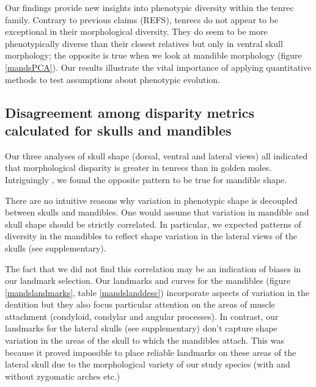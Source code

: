 \documentclass[12pt,a4paper]{article}
\begin{document}
Our findings provide new insights into phenotypic diversity within the tenrec family. Contrary to previous claims (REFS), tenrecs do not appear to be exceptional in their morphological diversity. They do seem to be more phenotypically diverse than their closest relatives but only in ventral skull morphology; the opposite is true when we look at mandible morphology (figure \ref{mandsPCA}). Our results illustrate the vital importance of applying quantitative methods to test assumptions about phenotypic evolution. %

\subsection{Disagreement among disparity metrics calculated for skulls and mandibles}

Our three analyses of skull shape (dorsal, ventral and lateral views) all indicated that morphological disparity is greater in tenrecs than in golden moles. Intriguingly %
, we found the opposite pattern to be true for mandible shape.

There are no intuitive reasons why variation in phenotypic shape is decoupled between skulls and mandibles. One would assume that variation in mandible and skull shape should be strictly correlated. In particular, we expected patterns of diversity in the mandibles to reflect shape variation in the lateral views of the skulls (see supplementary). %

The fact that we did not find this correlation may be an indication of biases in our landmark selection. Our landmarks and curves for the mandibles (figure \ref{mandslandmarks}, table \ref{mandslanddesc}) incorporate aspects of variation in the dentition but they also focus particular attention on the areas of muscle attachment (condyloid, condylar and angular processes). In contrast, our landmarks for the lateral skulls (see supplementary) don't capture shape variation in the areas of the skull to which the mandibles attach. This was because it proved impossible to place reliable landmarks on these areas of the lateral skull due to the morphological variety of our study species (with and without zygomatic arches etc.)
\end{document}
